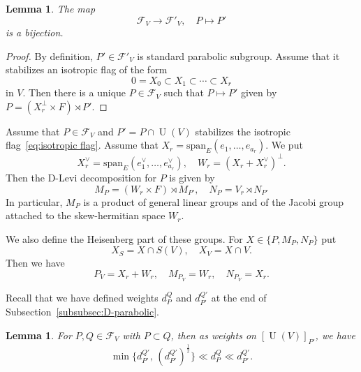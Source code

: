 \documentclass[letterpaper,11pt]{amsart}
\newcommand{\cF}{\mathcal{F}}
\newcommand{\<}{\negthickspace}
\DeclareMathOperator{\U}{U}
\theoremstyle{definition}
\theoremstyle{plain}
\newtheorem{lemma}[definition]{Lemma}
\theoremstyle{remark}
\numberwithin{equation}{section}
\begin{document}
\begin{lemma}   \label{lemma:Jacobi_parabolic_subgroup_bijection}
The map
    \[
    \cF_V \to \cF'_{V}, \quad P \mapsto P'
    \]
is a bijection.
\end{lemma}

\begin{proof}
By definition, $P' \in \cF'_{V}$ is standard parabolic subgroup. Assume that
it stabilizes an isotropic flag of the form
    \begin{equation} \label{eq:isotropic flag}
    0=X_0 \subset X_1 \subset \cdots \subset X_r
    \end{equation}
in $V$. Then there is a unique $P \in \cF_V$ such that $P \mapsto P'$
given by $P = (X_r^\perp \times F) \rtimes P'$.
\end{proof}

Assume that $P \in \cF_V$ and $P' = P \cap \U(V)$ stabilizes the isotropic
flag~\eqref{eq:isotropic flag}. Assume that $X_r = \mathrm{span}_E(e_1, \hdots, e_{a_r})$. We put
    \[
    X_r^\vee = \mathrm{span}_E(e_1^\vee, \hdots, e_{a_r}^\vee), \quad
    W_r = (X_r + X_r^\vee)^\perp.
    \]
Then the D-Levi decomposition for $P$ is given by
    \[
     M_P = (W_r \times F) \rtimes M_{P'}, \quad N_P = V_r \rtimes N_{P'}
    \]
In particular, $M_P$ is a product of general linear groups and of the Jacobi group
attached to the skew-hermitian space $W_r$.

We also define the Heisenberg part of these groups. For $X \in \{P,M_P,N_P\}$
put
    \[
    X_S = X \cap S(V), \quad    X_{V}=X \cap V.
    \]
Then we have
    \[
    P_V = X_r + W_r , \quad  M_{P_V} = W_r , \quad N_{P_V} = X_r.
    \]

Recall that we have defined weights $d_P^Q$ and $d_{P'}^{Q'}$
at the end of Subsection~\ref{subsubsec:D-parabolic}.

\begin{lemma} \label{lem:d_P^Q_unitary_equivalent}
For $P,Q \in \cF_V$ with $P \subset Q$, then as weights on
$[\U(V)]_{P'}$, we have
        \[
        \min \{d_{P'}^{Q'},\, (d_{P'}^{Q'})^{\frac 12} \}
        \ll d_{P}^{Q} \ll d_{P'}^{Q'}.
        \]
\end{lemma}
\end{document}
